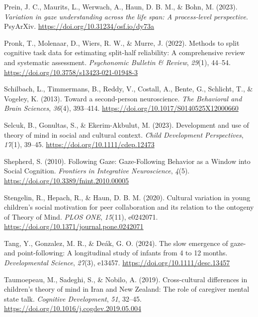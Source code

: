 \documentclass[
  man,mask,floatsintext]{apa7}
\newlength{\cslhangindent}
\newlength{\cslentryspacingunit} %
\newenvironment{CSLReferences}[2] %
 {%
  \setlength{\parindent}{0pt}
  \ifodd #1
  \let\oldpar\par
  \def\par{\hangindent=\cslhangindent\oldpar}
  \fi
  \setlength{\parskip}{#2\cslentryspacingunit}
 }%
 {}
\begin{document}
\begin{CSLReferences}{1}{0}
\leavevmode{}%
Prein, J. C., Maurits, L., Werwach, A., Haun, D. B. M., \& Bohn, M. (2023). \emph{Variation in gaze understanding across the life span: {A} process-level perspective}. PsyArXiv. \url{https://doi.org/10.31234/osf.io/dy73a}

\leavevmode{}%
Pronk, T., Molenaar, D., Wiers, R. W., \& Murre, J. (2022). Methods to split cognitive task data for estimating split-half reliability: {A} comprehensive review and systematic assessment. \emph{Psychonomic Bulletin \& Review}, \emph{29}(1), 44--54. \url{https://doi.org/10.3758/s13423-021-01948-3}

\leavevmode{}%
Schilbach, L., Timmermans, B., Reddy, V., Costall, A., Bente, G., Schlicht, T., \& Vogeley, K. (2013). Toward a second-person neuroscience. \emph{The Behavioral and Brain Sciences}, \emph{36}(4), 393--414. \url{https://doi.org/10.1017/S0140525X12000660}

\leavevmode{}%
Selcuk, B., Gonultas, S., \& Ekerim-Akbulut, M. (2023). Development and use of theory of mind in social and cultural context. \emph{Child Development Perspectives}, \emph{17}(1), 39--45. \url{https://doi.org/10.1111/cdep.12473}

\leavevmode{}%
Shepherd, S. (2010). Following {Gaze}: {Gaze-Following Behavior} as a {Window} into {Social Cognition}. \emph{Frontiers in Integrative Neuroscience}, \emph{4}(5). \url{https://doi.org/10.3389/fnint.2010.00005}

\leavevmode{}%
Stengelin, R., Hepach, R., \& Haun, D. B. M. (2020). Cultural variation in young children's social motivation for peer collaboration and its relation to the ontogeny of {Theory} of {Mind}. \emph{PLOS ONE}, \emph{15}(11), e0242071. \url{https://doi.org/10.1371/journal.pone.0242071}

\leavevmode{}%
Tang, Y., Gonzalez, M. R., \& Deák, G. O. (2024). The slow emergence of gaze- and point-following: {A} longitudinal study of infants from 4 to 12 months. \emph{Developmental Science}, \emph{27}(3), e13457. \url{https://doi.org/10.1111/desc.13457}

\leavevmode{}%
Taumoepeau, M., Sadeghi, S., \& Nobilo, A. (2019). Cross-cultural differences in children's theory of mind in {Iran} and {New Zealand}: {The} role of caregiver mental state talk. \emph{Cognitive Development}, \emph{51}, 32--45. \url{https://doi.org/10.1016/j.cogdev.2019.05.004}


\end{CSLReferences}
\end{document}
